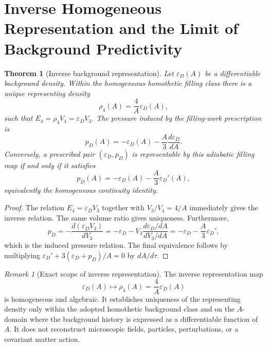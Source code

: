 \documentclass[11pt,a4paper]{article}
\def\dd{d}%
\numberwithin{equation}{section}
\theoremstyle{definition}
\theoremstyle{plain}
\newtheorem{theorem}[criterion]{Theorem}
\theoremstyle{remark}
\newtheorem{remark}[criterion]{Remark}
\newcommand{\Efour}{E_4}
\newcommand{\rhoFour}{\rho_4}
\newcommand{\epsD}{\varepsilon_D}
\newcommand{\pD}{p_D}
\newcommand{\dd}{\mathrm{d}}
\begin{document}
\section{Inverse Homogeneous Representation and the Limit of Background Predictivity}
\begin{theorem}[Inverse background representation]
Let \(\epsD(A)\) be a differentiable background density. Within the homogeneous homothetic filling class there is a unique representing density
\begin{equation}
\rhoFour(A)=\frac{4}{A}\epsD(A),
\end{equation}
such that \(\Efour=\rhoFour V_4=\epsD V_3\). The pressure induced by the filling-work prescription is
\begin{equation}
\pD(A)=-\epsD(A)-\frac{A}{3}\frac{\dd\epsD}{\dd A}.
\end{equation}
Conversely, a prescribed pair \((\epsD,\pD)\) is representable by this adiabatic filling map if and only if it satisfies
\begin{equation}
\pD(A)=-\epsD(A)-\frac{A}{3}\epsD'(A),
\end{equation}
equivalently the homogeneous continuity identity.
\end{theorem}
\begin{proof}
The relation \(\Efour=\epsD V_3\) together with \(V_3/V_4=4/A\) immediately gives the inverse relation. The same volume ratio gives uniqueness. Furthermore,
\begin{equation}
\pD=-\frac{\dd(\epsD V_3)}{\dd V_3}
=-\epsD-V_3\frac{\dd\epsD/\dd A}{\dd V_3/\dd A}
=-\epsD-\frac{A}{3}\epsD',
\end{equation}
which is the induced pressure relation. The final equivalence follows by multiplying \(\epsD'+3(\epsD+\pD)/A=0\) by \(\dd A/\dd\tau\).
\end{proof}

\begin{remark}[Exact scope of inverse representation]
The inverse representation map
\begin{equation}
\epsD(A)\longmapsto \rhoFour(A)=\frac{4}{A}\epsD(A)
\end{equation}
is homogeneous and algebraic. It establishes uniqueness of the representing density only within the adopted homothetic background class and on the \(A\)-domain where the background history is expressed as a differentiable function of \(A\). It does not reconstruct microscopic fields, particles, perturbations, or a covariant matter action.
\end{remark}
\end{document}
